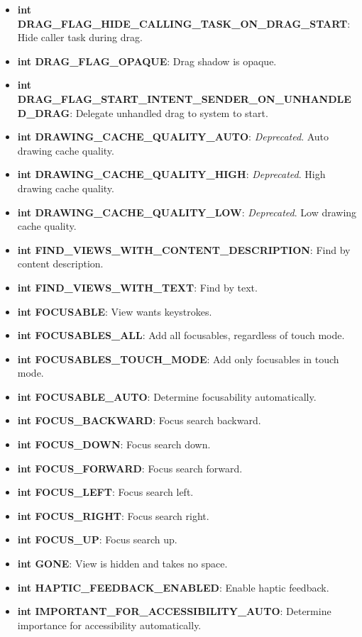 \documentclass{report}
\begin{document}
\begin{itemize}
\begin{itemize}
                \item \textbf{int DRAG\_FLAG\_HIDE\_CALLING\_TASK\_ON\_DRAG\_START}: Hide caller task during drag.
                \item \textbf{int DRAG\_FLAG\_OPAQUE}: Drag shadow is opaque.
                \item \textbf{int DRAG\_FLAG\_START\_INTENT\_SENDER\_ON\_UNHANDLED\_DRAG}: Delegate unhandled drag to system to start.
                \item \textbf{int DRAWING\_CACHE\_QUALITY\_AUTO}: \textit{Deprecated}. Auto drawing cache quality.
                \item \textbf{int DRAWING\_CACHE\_QUALITY\_HIGH}: \textit{Deprecated}. High drawing cache quality.
                \item \textbf{int DRAWING\_CACHE\_QUALITY\_LOW}: \textit{Deprecated}. Low drawing cache quality.
                \item \textbf{int FIND\_VIEWS\_WITH\_CONTENT\_DESCRIPTION}: Find by content description.
                \item \textbf{int FIND\_VIEWS\_WITH\_TEXT}: Find by text.
                \item \textbf{int FOCUSABLE}: View wants keystrokes.
                \item \textbf{int FOCUSABLES\_ALL}: Add all focusables, regardless of touch mode.
                \item \textbf{int FOCUSABLES\_TOUCH\_MODE}: Add only focusables in touch mode.
                \item \textbf{int FOCUSABLE\_AUTO}: Determine focusability automatically.
                \item \textbf{int FOCUS\_BACKWARD}: Focus search backward.
                \item \textbf{int FOCUS\_DOWN}: Focus search down.
                \item \textbf{int FOCUS\_FORWARD}: Focus search forward.
                \item \textbf{int FOCUS\_LEFT}: Focus search left.
                \item \textbf{int FOCUS\_RIGHT}: Focus search right.
                \item \textbf{int FOCUS\_UP}: Focus search up.
                \item \textbf{int GONE}: View is hidden and takes no space.
                \item \textbf{int HAPTIC\_FEEDBACK\_ENABLED}: Enable haptic feedback.
                \item \textbf{int IMPORTANT\_FOR\_ACCESSIBILITY\_AUTO}: Determine importance for accessibility automatically.

\end{itemize}
\end{itemize}
\end{document}
